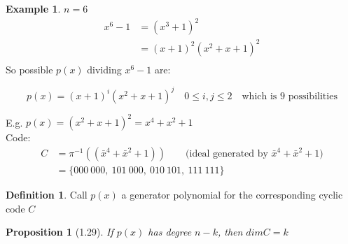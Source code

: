\documentclass[]{article}
\newtheorem{prop}[thm]{Proposition}
\theoremstyle{definition}
\newtheorem*{defn}{Definition}
\newtheorem*{exmp}{Example}
\theoremstyle{remark}
\numberwithin{equation}{section}
\begin{document}
			\begin{exmp} $n=6$
				\begin{align*}
					x^6 - 1 &= (x^3 +1)^2 \\
							&= (x+1)^2(x^2+x+1)^2\\
				\end{align*}
				So possible $p(x)$ dividing $x^6-1$ are:

				\[
					p(x) = (x+1)^i (x^2+x+1)^j \quad 0 \leq i,j \leq 2 \quad \text{which is $9$ possibilities}
				\]

				E.g. $p(x) = (x^2+x+1)^2 = x^4 + x^2 + 1$\\

				Code:
				\begin{align*}
					C &= \pi^{-1}((\bar{x}^4 + \bar{x}^2 + 1))\qquad \text{(ideal generated by $\bar{x}^4 + \bar{x}^2 + 1$)}\\
					  &= \{000\ 000,\ 101\ 000,\ 010\ 101,\ 111\ 111 \}
				\end{align*}
			\end{exmp}

			\begin{defn}Call $p(x)$ a generator polynomial for the corresponding cyclic code $C$
			\end{defn}

			\begin{prop}[1.29]If $p(x)$ has degree $n-k$, then $dimC = k$
			\end{prop}
\end{document}
